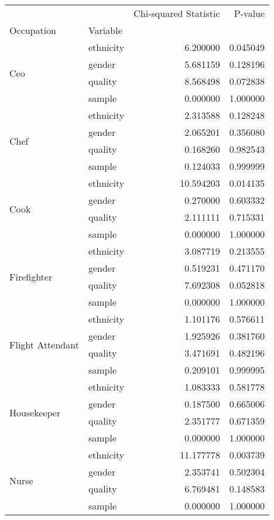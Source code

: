 \begin{tabular}{llrr}
\toprule
 &  & Chi-squared Statistic & P-value \\
Occupation & Variable &  &  \\
\midrule
\multirow[t]{4}{*}{Ceo } & ethnicity & 6.200000 & 0.045049 \\
 & gender & 5.681159 & 0.128196 \\
 & quality & 8.568498 & 0.072838 \\
 & sample & 0.000000 & 1.000000 \\
\cline{1-4}
\multirow[t]{4}{*}{Chef } & ethnicity & 2.313588 & 0.128248 \\
 & gender & 2.065201 & 0.356080 \\
 & quality & 0.168260 & 0.982543 \\
 & sample & 0.124033 & 0.999999 \\
\cline{1-4}
\multirow[t]{4}{*}{Cook } & ethnicity & 10.594203 & 0.014135 \\
 & gender & 0.270000 & 0.603332 \\
 & quality & 2.111111 & 0.715331 \\
 & sample & 0.000000 & 1.000000 \\
\cline{1-4}
\multirow[t]{4}{*}{Firefighter } & ethnicity & 3.087719 & 0.213555 \\
 & gender & 0.519231 & 0.471170 \\
 & quality & 7.692308 & 0.052818 \\
 & sample & 0.000000 & 1.000000 \\
\cline{1-4}
\multirow[t]{4}{*}{Flight Attendant } & ethnicity & 1.101176 & 0.576611 \\
 & gender & 1.925926 & 0.381760 \\
 & quality & 3.471691 & 0.482196 \\
 & sample & 0.209101 & 0.999995 \\
\cline{1-4}
\multirow[t]{4}{*}{Housekeeper } & ethnicity & 1.083333 & 0.581778 \\
 & gender & 0.187500 & 0.665006 \\
 & quality & 2.351777 & 0.671359 \\
 & sample & 0.000000 & 1.000000 \\
\cline{1-4}
\multirow[t]{4}{*}{Nurse  } & ethnicity & 11.177778 & 0.003739 \\
 & gender & 2.353741 & 0.502304 \\
 & quality & 6.769481 & 0.148583 \\
 & sample & 0.000000 & 1.000000 \\

\end{tabular}
